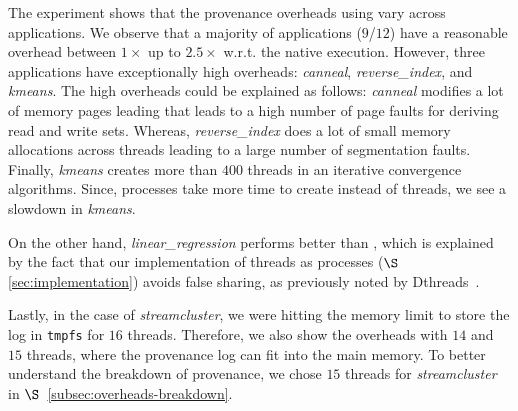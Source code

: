The experiment shows that the provenance overheads using \projecttitle vary across applications. 
We observe that a majority of applications ($9$/$12$) have a reasonable overhead between $1\times$ up to $2.5\times$ w.r.t. the native execution. However, three applications have exceptionally high overheads:  {\em canneal}, {\em reverse\_index}, and {\em kmeans}. The high overheads could be explained as follows: {\em canneal} modifies a lot of memory pages leading that leads to a high number of page faults for deriving read and write sets. Whereas, {\em reverse\_index} does a lot of small memory allocations across threads leading to a large number of segmentation faults.  Finally, {\em kmeans} creates more than $400$ threads in an iterative convergence algorithms. Since, processes take more time to create instead of threads, we see a slowdown in {\em kmeans}.


On the other hand, {\em linear\_regression} performs better than \pthreads, which is explained by the fact that our implementation of threads as processes ($\S$\ref{sec:implementation})  avoids false sharing, as previously noted by Dthreads~\cite{dthreads-sosp-2011}.



Lastly, in the case of {\em streamcluster}, we were hitting the memory limit to store the log in {\tt tmpfs} for $16$ threads. Therefore, we also show the overheads with $14$ and $15$ threads,  where the provenance log can fit into the main memory.  To better understand the breakdown of provenance, we chose $15$ threads for {\em streamcluster} in $\S$~\ref{subsec:overheads-breakdown}.



%


